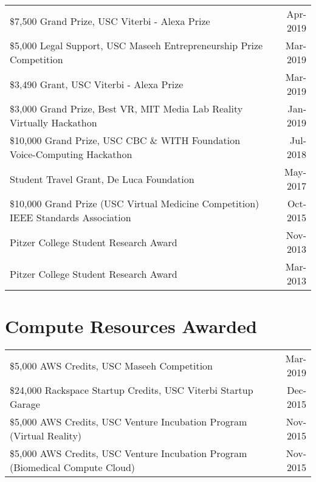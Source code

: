 \documentclass[10pt,a4paper]{article}
\begin{document}
  \vspace*{1mm}\noindent\begin{tabularx}{17cm}{X r}
    \$7,500 Grand Prize, USC Viterbi - Alexa Prize & Apr-2019 \\ %
    \$5,000 Legal Support, USC Maseeh Entrepreneurship Prize Competition & Mar-2019 \\ %
    \$3,490 Grant, USC Viterbi - Alexa Prize & Mar-2019 \\ %
    \$3,000 Grand Prize, Best VR, MIT Media Lab Reality Virtually Hackathon & Jan-2019\\ %
  	\$10,000 Grand Prize, USC CBC \& WITH Foundation Voice-Computing Hackathon & Jul-2018\\ %
    Student Travel Grant, De Luca Foundation & May-2017\\ %
    \$10,000 Grand Prize (USC Virtual Medicine Competition) IEEE Standards Association  & Oct-2015\\ %
    Pitzer College Student Research Award & Nov-2013 \\
    Pitzer College Student Research Award & Mar-2013 \\

  \end{tabularx}

\vspace*{2mm}\section*{Compute Resources Awarded}
  
  \vspace*{1mm}\noindent\begin{tabularx}{17cm}{X r}

    \$5,000 AWS Credits, USC Maseeh Competition & Mar-2019\\
    \$24,000 Rackspace Startup Credits, USC Viterbi Startup Garage & Dec-2015\\
    \$5,000 AWS Credits, USC Venture Incubation Program (Virtual Reality) & Nov-2015\\
    \$5,000 AWS Credits, USC Venture Incubation Program (Biomedical Compute Cloud) & Nov-2015\\

  \end{tabularx}
\end{document}
